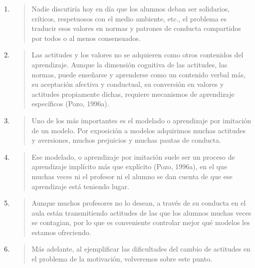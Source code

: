 \documentclass{article}
\begin{document}
\begin{enumerate}
  \item \begin{quote}
  Nadie discutiría hoy en día que los alumnos deban ser solidarios, críticos, respetuosos con el medio ambiente, etc., el problema es traducir esos valores en normas y patrones de conducta compartidos por todos o al menos consensuados.
  \end{quote}

  \item \begin{quote}
  Las actitudes y los valores no se adquieren como otros contenidos del aprendizaje. Aunque la dimensión cognitiva de las actitudes, las normas, puede enseñarse y aprenderse como un contenido verbal más, su aceptación afectiva y conductual, su conversión en valores y actitudes propiamente dichas, requiere mecanismos de aprendizaje específicos (Pozo, 1996a).
  \end{quote}

  \item \begin{quote}
  Uno de los más importantes es el modelado o aprendizaje por imitación de un modelo. Por exposición a modelos adquirimos muchas actitudes y aversiones, muchos prejuicios y muchas pautas de conducta.
  \end{quote}

  \item \begin{quote}
  Ese modelado, o aprendizaje por imitación suele ser un proceso de aprendizaje implícito más que explícito (Pozo, 1996a), en el que muchas veces ni el profesor ni el alumno se dan cuenta de que ese aprendizaje está teniendo lugar.
  \end{quote}

  \item \begin{quote}
  Aunque muchos profesores no lo desean, a través de su conducta en el aula están transmitiendo actitudes de las que los alumnos muchas veces se contagian, por lo que es conveniente controlar mejor qué modelos les estamos ofreciendo.
  \end{quote}

  \item \begin{quote}
  Más adelante, al ejemplificar las dificultades del cambio de actitudes en el problema de la motivación, volveremos sobre este punto.
  \end{quote}
\end{enumerate}
\end{document}

